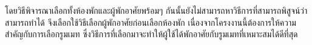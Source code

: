 โดยวิธีพิจารณาเลือกทั้งห้องพักและผู้พักอาศัยพร้อมๆ กันนั้นยังไม่สามารถหาวิธีการที่สามารถพิสูจน์ว่าสามารถทำได้
จึงเลือกใช้วิธีเลือกผู้พักอาศัยก่อนเลือกห้องพัก เนื่องจากโครงงานนี้ต้องการให้ความสำคัญกับการเลือกรูมเมท ซึ่งวิธีการที่เลือกมาจะทำให้ผู้ใช้ได้พักอาศัยกับรูมเมทที่เหมาะสมได้ดีที่สุด

